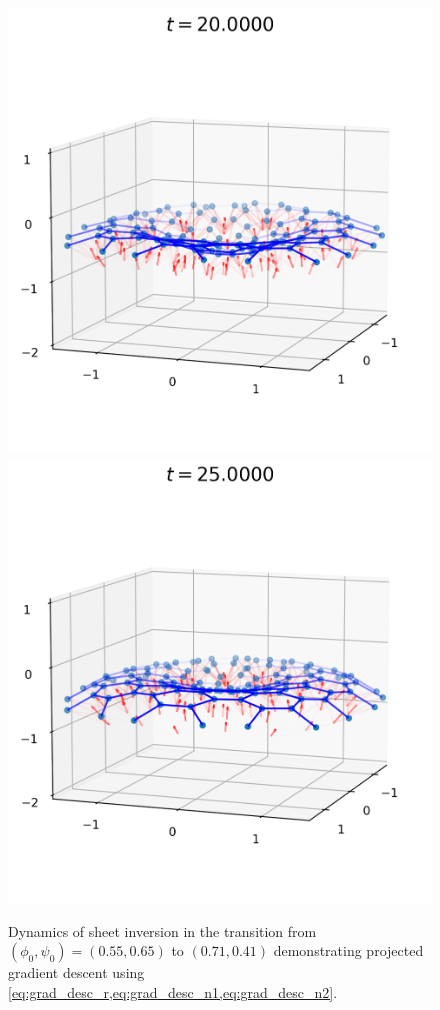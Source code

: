 \begin{landscape}
\begin{figure}[p]
	\includegraphics[width=0.32\textheight]{dynamics/08000.png}
	\includegraphics[width=0.32\textheight]{dynamics/10000.png}
	\caption[Gradient descent equilibration and dynamics of sheet inversion]{Dynamics of sheet inversion in the transition from $(\phi_0, \psi_0)=(0.55, 0.65)$ to $(0.71,0.41)$ demonstrating projected gradient descent using \cref{eq:grad_desc_r,eq:grad_desc_n1,eq:grad_desc_n2}.}
	\label{fig:dynamics}
\end{figure}
\end{landscape}


